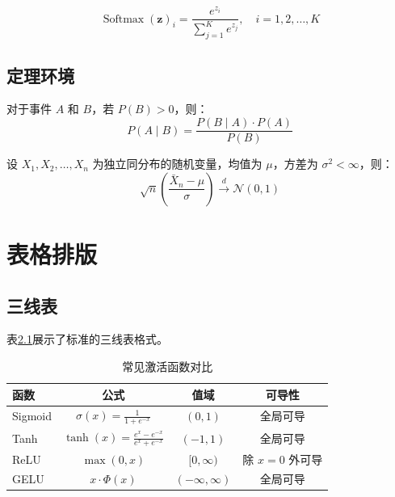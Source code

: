 \documentclass{harryopo-report}
\begin{document}
\begin{equation}
\operatorname{Softmax}(\mathbf{z})_i = \frac{e^{z_i}}{\sum_{j=1}^{K} e^{z_j}}, \quad i = 1, 2, \dots, K
\label{eq:softmax}
\end{equation}

\section{定理环境}

\begin{definition}[贝叶斯公式]
对于事件 $A$ 和 $B$，若 $P(B) > 0$，则：
\begin{equation}
P(A \mid B) = \frac{P(B \mid A) \cdot P(A)}{P(B)}
\end{equation}
\end{definition}

\begin{theorem}[中心极限定理]
设 $X_1, X_2, \dots, X_n$ 为独立同分布的随机变量，均值为 $\mu$，方差为 $\sigma^{2} < \infty$，则：
\begin{equation}
\sqrt{n}\left(\frac{\bar{X}_n - \mu}{\sigma}\right) \xrightarrow{d} \mathcal{N}(0, 1)
\end{equation}
\end{theorem}

\chapter{表格排版}

\section{三线表}

表\ref{tab:compare}展示了标准的三线表格式。

\begin{table}[htbp]
\centering
\begin{tabular}{lccc}
\toprule
\textbf{函数} & \textbf{公式} & \textbf{值域} & \textbf{可导性} \\
\midrule
Sigmoid & $\sigma(x) = \frac{1}{1+e^{-x}}$ & $(0, 1)$ & 全局可导 \\
Tanh    & $\tanh(x) = \frac{e^{x}-e^{-x}}{e^{x}+e^{-x}}$ & $(-1, 1)$ & 全局可导 \\
ReLU    & $\max(0, x)$ & $[0, \infty)$ & 除 $x=0$ 外可导 \\
GELU    & $x \cdot \Phi(x)$ & $(-\infty, \infty)$ & 全局可导 \\
\bottomrule
\end{tabular}
\caption{常见激活函数对比}
\label{tab:compare}
\end{table}
\end{document}
